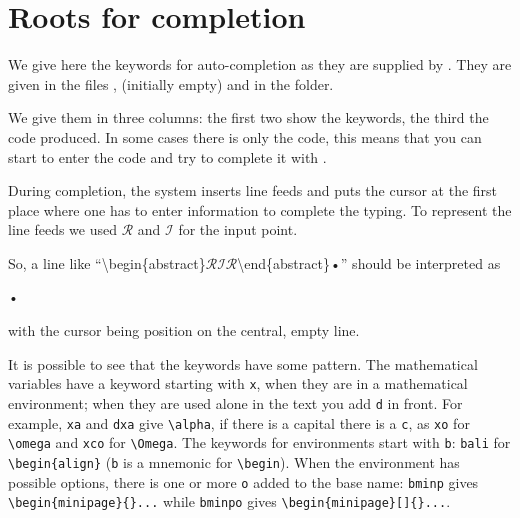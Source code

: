 \section{Roots for completion}
\label{sec.autocompletion}

We give here the keywords for auto-completion as they are supplied by {\Tw}. They are given in the files ,  (initially empty) and  in the  folder.

We give them in three columns: the first two show the keywords, the third the {\AllTeX} code produced. In some cases there is only the code, this means that you can start to enter the {\AllTeX} code and try to complete it with .

\newcommand{\AutoCompRet}{$\mathcal{R}$}
\newcommand{\AutoCompIns}{$\mathcal{I}$}
During completion, the system inserts line feeds and puts the cursor at the first place where one has to enter information to complete the typing. To represent the line feeds we used {\AutoCompRet} and {\AutoCompIns} for the input point. 

So, a line like ``\textbackslash begin\{abstract\}{\AutoCompRet}{\AutoCompIns}{\AutoCompRet}\textbackslash end\{abstract\}•'' should be interpreted as
\begin{verbExample}
\begin{abstract}

\end{abstract}•
\end{verbExample}
with the cursor being position on the central, empty line.

It is possible to see that the keywords have some pattern. The mathematical variables have a keyword starting with \verb|x|, when they are in a mathematical environment; when they are used alone in the text you add \verb|d| in front. For example, \verb|xa| and \verb|dxa| give \verb|\alpha|, if there is a capital there is a \verb|c|, as  \verb|xo| for \verb|\omega| and \verb|xco| for \verb|\Omega|. The keywords for environments start with \verb|b|: \verb|bali| for \verb|\begin{align}| (\verb|b| is a mnemonic for \verb|\begin|). When the environment has possible options, there is one or more \verb|o| added to the base name: \verb|bminp| gives \verb|\begin{minipage}{}...| while \verb|bminpo| gives \verb|\begin{minipage}[]{}...|.

